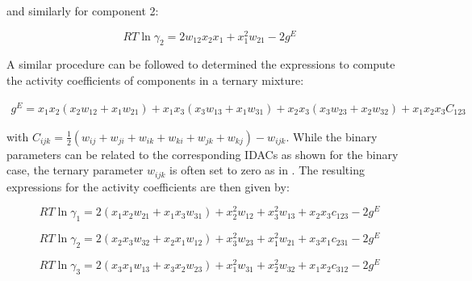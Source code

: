 \noindent and similarly for component 2:

\begin{equation}
    RT \ln{\gamma_2} = 2 w_{12} x_2 x_1 + x_1^2 w_{21} - 2 g^E
\end{equation}

A similar procedure can be followed to determined the expressions to compute the activity coefficients of components in a ternary mixture:

\begin{align}
    g^E = x_1 x_2 (x_2 w_{12} + x_1 w_{21}) + x_1 x_3 (x_3 w_{13} + x_1 w_{31}) + x_2 x_3 (x_3 w_{23} + x_2 w_{32}) + x_1 x_2 x_3 C_{123}
    \label{eq_ge_margules_ternary}
\end{align}

with $ C_{ijk} = \frac{1}{2}(w_{ij} + w_{ji} + w_{ik} + w_{ki} + w_{jk} + w_{kj}) - w_{ijk}$. While the binary parameters can be related to the corresponding IDACs as shown for the binary case, the ternary parameter $w_{ijk}$ is often set to zero as in \cite{andersen1981valid}. The resulting expressions for the activity coefficients are then given by:

\begin{equation}
    RT \ln{\gamma_1} = 2(x_1 x_2 w_{21} + x_1 x_3 w_{31}) + x_2^2 w_{12} + x_3^2 w_{13} + x_2 x_3 c_{123} - 2 g^E
\end{equation}

\begin{equation}
    RT \ln{\gamma_2} = 2(x_2 x_3 w_{32} + x_2 x_1 w_{12}) + x_3^2 w_{23} + x_1^2 w_{21} + x_3 x_1 c_{231} - 2 g^E
\end{equation}

\begin{equation}
    RT \ln{\gamma_3} = 2(x_3 x_1 w_{13} + x_3 x_2 w_{23}) + x_1^2 w_{31} + x_2^2 w_{32} + x_1 x_2 c_{312} - 2 g^E
\end{equation}